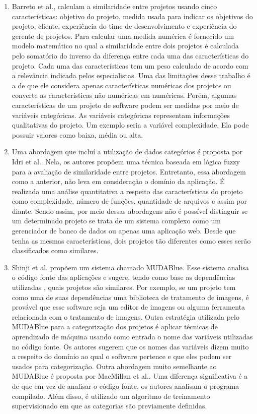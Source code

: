 \begin{enumerate} 
\item  Barreto et al.\cite{barreto2010analyzing}, calculam a similaridade entre projetos usando cinco características: objetivo do projeto, medida usada para indicar os objetivos do projeto, cliente, experiência do time de desenvolvimento e experiência do gerente de projetos.  Para calcular uma medida numérica é fornecido um modelo matemático no qual a similaridade entre dois projetos é calculada pelo somatório do inverso da diferença entre cada uma das características do projeto. Cada uma das características tem um peso calculado de acordo com a relevância indicada pelos especialistas. Uma das limitações desse trabalho é a de que ele considera apenas características numéricas dos projetos ou converte as características não numéricas em numéricas. Porém, algumas características de um projeto de software podem ser medidas por meio de variáveis categóricas. As variáveis categóricas representam informações qualitativas do projeto. Um exemplo seria a variável complexidade. Ela pode possuir valores como baixa, média ou alta. 

\item Uma abordagem que incluí a utilização de dados categórios é proposta por  Idri et al.\cite{idri2001fuzzy}. Nela, os autores propõem uma técnica baseada em lógica fuzzy para a avaliação de similaridade entre projetos.  Entretanto, essa abordagem como a anterior, não leva em consideração o domínio da aplicação. É realizada uma análise quantitativa a respeito das características do projeto como complexidade, número de funções, quantidade de arquivos e assim por diante. Sendo assim, por meio dessas abordagens não é possível distinguir se um determinado projeto se trata de um sistema complexo como um gerenciador de banco de dados ou apenas uma aplicação web. Desde que tenha as mesmas características, dois projetos tão diferentes como esses serão classificados como similares.

\item  Shinji et al. propõem um sistema chamado MUDABlue\cite{kawaguchi2006mudablue}. Esse sistema analisa o código fonte das aplicações e sugere, tendo como base as  dependências utilizadas , quais projetos são similares.  Por exemplo, se um projeto tem como uma de suas dependências uma biblioteca de tratamento de imagens, é provável que esse software seja um editor de imagens ou alguma ferramenta relacionada com o tratamento de imagens. Outra estratégia utilizada pelo MUDABlue para a categorização dos projetos é aplicar técnicas de aprendizado de máquina usando como entrada o nome das variáveis utilizadas no código fonte. Os autores sugerem que os nomes das variáveis dizem muito a respeito do domínio ao qual o software pertence e que eles podem ser usados para categorização. Outra abordagem muito semelhante ao MUDABlue é proposta por  MacMillan et al.\cite{mcmillan2011categorizing}. Uma diferença significativa é a de que em vez de analisar o código fonte, os autores analisam o programa compilado. Além disso, é utilizado um algoritmo de treinamento supervisionado em que as categorias são previamente definidas. 


\end{enumerate}
